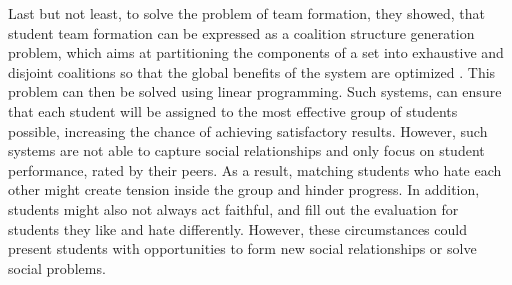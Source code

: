 \documentclass{Academic}
\begin{document}
    Last but not least, to solve the problem of team formation, they showed, that student team formation can be expressed as a coalition structure generation problem, which aims at partitioning the components of a set into exhaustive and disjoint coalitions so that the global benefits of the system are optimized \cite{alberola_artificial_2016}. This problem can then be solved using linear programming. Such systems, can ensure that each student will be assigned to the most effective group of students possible, increasing the chance of achieving satisfactory results. However, such systems are not able to capture social relationships and only focus on student performance, rated by their peers. As a result, matching students who hate each other might create tension inside the group and hinder progress. In addition, students might also not always act faithful, and fill out the evaluation for students they like and hate differently. However, these circumstances could present students with opportunities to form new social relationships or solve social problems.
\end{document}
